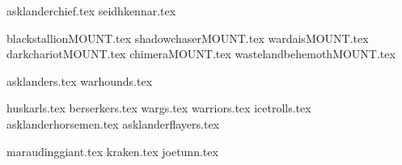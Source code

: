 
{asklanderchief.tex}
{seidhkennar.tex}

\clearpage
{}
{blackstallionMOUNT.tex}
{shadowchaserMOUNT.tex}
{wardaisMOUNT.tex}
{darkchariotMOUNT.tex}
{chimeraMOUNT.tex}
{wastelandbehemothMOUNT.tex}

\clearpage
{}
{asklanders.tex}
{warhounds.tex}

\clearpage
{}

{huskarls.tex}
{berserkers.tex}
{wargs.tex}
{warriors.tex}
{icetrolls.tex}
{asklanderhorsemen.tex}
{asklanderflayers.tex}

\clearpage
{}
{maraudinggiant.tex}
{kraken.tex}
{joetunn.tex}
